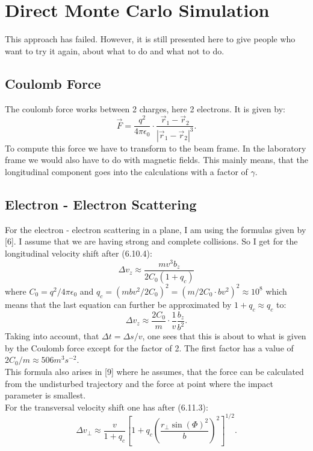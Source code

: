 \section{Direct Monte Carlo Simulation}
This approach has failed. However, it is still presented here to give people who want to try it again, about what to do and what not to do.
\subsection{Coulomb Force}
The coulomb force works between 2 charges, here 2 electrons. It is given by:
\begin{equation} \vec F = \frac {q^2} {4 \pi \epsilon_0} \cdot \frac {\vec r_1 - \vec r_2}{|\vec r_1 - \vec r_2|^3}. \end{equation}
To compute this force we have to transform to the beam frame. In the laboratory frame we would also have to do with magnetic fields. This mainly means, that the longitudinal component goes into the calculations with a factor of $\gamma$.

\subsection{Electron - Electron Scattering}
For the electron - electron scattering in a plane, I am using the formulas given by [6]. I assume that we are having strong and complete collisions. So I get for the longitudinal velocity shift after (6.10.4):
\begin{equation} \Delta v_z \approx \frac{m v^3 b_z}{2 C_0 (1 + q_c)} \end{equation}
where $C_0 = q^2 / 4 \pi \epsilon_0$ and $q_c = (m b v^2/2 C_0)^2 = (m/2C_0 \cdot b v^2)^2 \approx 10^8$ which means that the last equation can further be approximated by $1 + q_c \approx q_c$ to:
\begin{equation} \Delta v_z \approx  \frac{2 C_0} m \cdot \frac 1 v \frac {b_z}{b^2}. \end{equation}
Taking into account, that $\Delta t = \Delta s/v$, one sees that this is about to what is given by the Coulomb force except for the factor of 2. The first factor has a value of $2 C_0 / m \approx 506 m^3 s^{-2}$.\\
This formula also arises in [9] where he assumes, that the force can be calculated from the undisturbed trajectory and the force at point where the impact parameter is smallest.\\
For the transversal velocity shift one has after (6.11.3):
\begin{equation} \Delta v_\perp \approx \frac v {1 + q_c}\left[ 1 + q_c \left(\frac{r_\perp \sin(\Phi)^2}{b}\right)^2\right]^{1/2}. \end{equation}

